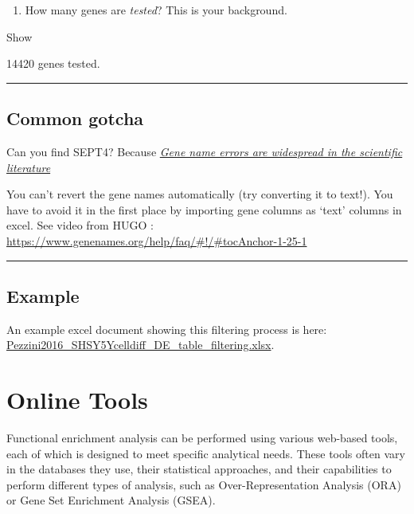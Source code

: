 \documentclass[
]{book}
\providecommand{\tightlist}{%
  \setlength{\itemsep}{0pt}\setlength{\parskip}{0pt}}
\begin{document}
\begin{enumerate}
\def\labelenumi{\arabic{enumi}.}
\setcounter{enumi}{2}
\tightlist
\item
  How many genes are \emph{tested}? This is your background.
\end{enumerate}

Show

14420 genes tested.

\begin{center}\rule{0.5\linewidth}{0.5pt}\end{center}

\hypertarget{common-gotcha}{%
\section{Common gotcha}\label{common-gotcha}}

Can you find SEPT4? Because \href{https://genomebiology.biomedcentral.com/articles/10.1186/s13059-016-1044-7}{\emph{Gene name errors are widespread in the scientific literature}}

You can't revert the gene names automatically (try converting it to text!). You have to avoid it in the first place by importing gene columns as `text' columns in excel. See video from HUGO : \url{https://www.genenames.org/help/faq/\#!/\#tocAnchor-1-25-1}

\begin{center}\rule{0.5\linewidth}{0.5pt}\end{center}

\hypertarget{example}{%
\section{Example}\label{example}}

An example excel document showing this filtering process is here: \href{https://monashbioinformaticsplatform.github.io/enrichment_analysis_workshop/data/Pezzini2016_SHSY5Ycelldiff_DE_table_filtering.xlsx}{Pezzini2016\_SHSY5Ycelldiff\_DE\_table\_filtering.xlsx}.

\hypertarget{online-tools}{%
\chapter{Online Tools}\label{online-tools}}

Functional enrichment analysis can be performed using various web-based tools, each of which is designed to meet specific analytical needs. These tools often vary in the databases they use, their statistical approaches, and their capabilities to perform different types of analysis, such as Over-Representation Analysis (ORA) or Gene Set Enrichment Analysis (GSEA).
\end{document}
